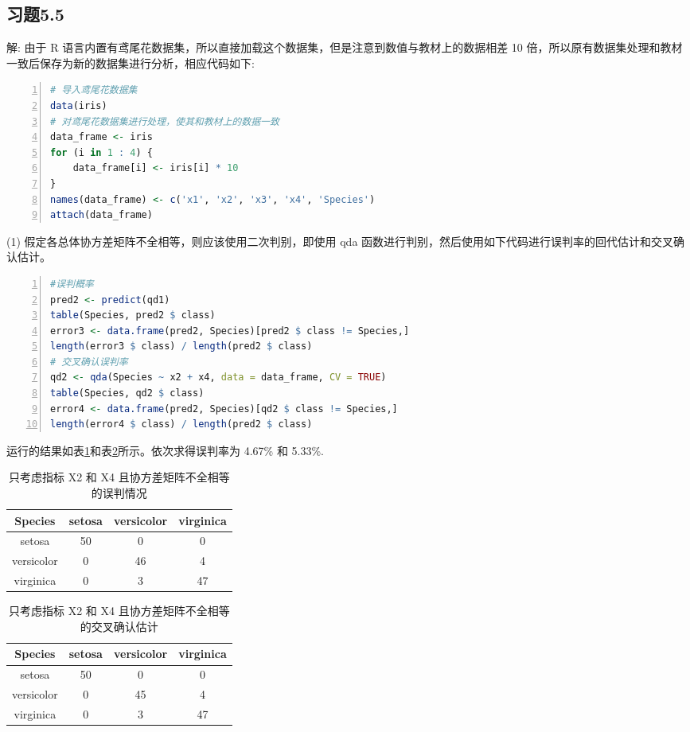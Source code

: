 \documentclass{ctexrep}
\begin{document}
\subsection*{习题5.5}
解: 由于 R 语言内置有鸢尾花数据集，所以直接加载这个数据集，但是注意到数值与教材上的数据相差 10 倍，所以原有数据集处理和教材一致后保存为新的数据集进行分析，相应代码如下:
\begin{lstlisting}[language=R, numbers=left, numberstyle=\tiny]
# 导入鸢尾花数据集
data(iris)
# 对鸢尾花数据集进行处理，使其和教材上的数据一致
data_frame <- iris
for (i in 1 : 4) {
    data_frame[i] <- iris[i] * 10
}
names(data_frame) <- c('x1', 'x2', 'x3', 'x4', 'Species')
attach(data_frame)
\end{lstlisting}
(1) 假定各总体协方差矩阵不全相等，则应该使用二次判别，即使用 qda 函数进行判别，然后使用如下代码进行误判率的回代估计和交叉确认估计。
\begin{lstlisting}[language=R, numbers=left, numberstyle=\tiny]
#误判概率
pred2 <- predict(qd1)
table(Species, pred2 $ class)
error3 <- data.frame(pred2, Species)[pred2 $ class != Species,]
length(error3 $ class) / length(pred2 $ class)
# 交叉确认误判率
qd2 <- qda(Species ~ x2 + x4, data = data_frame, CV = TRUE)
table(Species, qd2 $ class)
error4 <- data.frame(pred2, Species)[qd2 $ class != Species,]
length(error4 $ class) / length(pred2 $ class)
\end{lstlisting}
运行的结果如表\ref{tab:ex551}和表\ref{tab:ex552}所示。依次求得误判率为 4.67\% 和 5.33\%.
\begin{table}[ht!]
\begin{center}
\begin{tabular}{c|ccc}
Species & setosa & versicolor & virginica \\
\hline
setosa & 50 & 0 & 0 \\
versicolor & 0 & 46 & 4 \\
virginica & 0 & 3 & 47
\end{tabular}
\end{center}
\caption{只考虑指标 X2 和 X4 且协方差矩阵不全相等的误判情况}
\label{tab:ex551}
\end{table}
\begin{table}[h!]
\begin{center}
\begin{tabular}{c|ccc}
Species & setosa & versicolor & virginica \\
\hline
setosa & 50 & 0 & 0 \\
versicolor & 0 & 45 & 4 \\
virginica & 0 & 3 & 47
\end{tabular}
\end{center}
\caption{只考虑指标 X2 和 X4 且协方差矩阵不全相等的交叉确认估计}
\label{tab:ex552}
\end{table}
\end{document}
